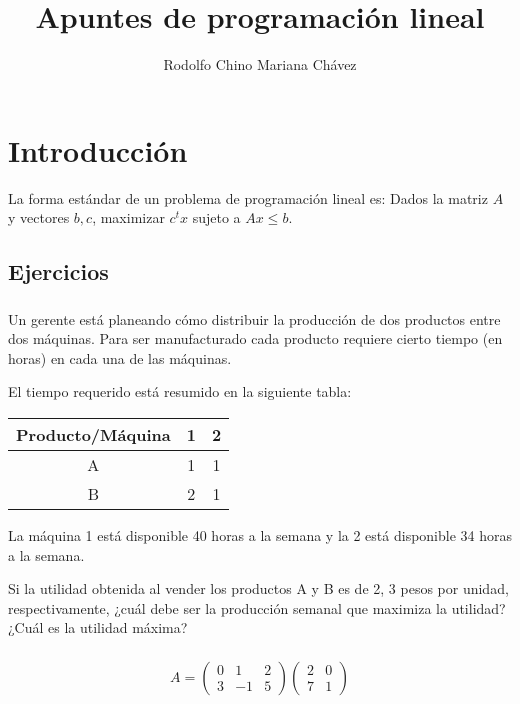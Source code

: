 \documentclass{article}
\title{Apuntes de programación lineal}
\author{Rodolfo Chino Mariana Chávez}
\begin{document}
\maketitle
\tableofcontents

\section{Introducción}

\label{sec:introduccion}


La forma estándar de un problema de programación lineal es:
Dados la matriz $A$ y vectores $b,c$, maximizar $c^tx$ sujeto a
$Ax\leq b$.

\subsection{Ejercicios}
\label{sec:ejercicios}

\subsubsection{}
Un gerente está planeando cómo distribuir la producción de dos productos entre dos máquinas. Para ser manufacturado cada producto requiere cierto tiempo (en horas) en cada una de las máquinas.

El tiempo requerido está resumido en la siguiente tabla:\\
\medskip
\begin{tabular}{|c|c|c|}
\hline
Producto/Máquina &	1 &	2\\
\hline
A                &  	1 &	1\\
\hline
B                &   	2 &	1\\                          
\hline 
\end{tabular}
\bigskip

La máquina 1 está disponible 40 horas a la semana y la 2 está disponible 34 horas a la semana.

Si la utilidad obtenida al vender los productos A y B es de 2, 3 pesos
por unidad, respectivamente, ¿cuál debe ser la producción semanal que
maximiza la utilidad? ¿Cuál es la utilidad máxima?


\subsubsection{}

\begin{equation*}
  \label{eq:1}
  A=
  \begin{pmatrix}
    0 & 1 & 2\\
    3 & -1 & 5
  \end{pmatrix}
  \begin{pmatrix}
    2 & 0\\
    7 & 1
  \end{pmatrix}
\end{equation*}
\end{document}
